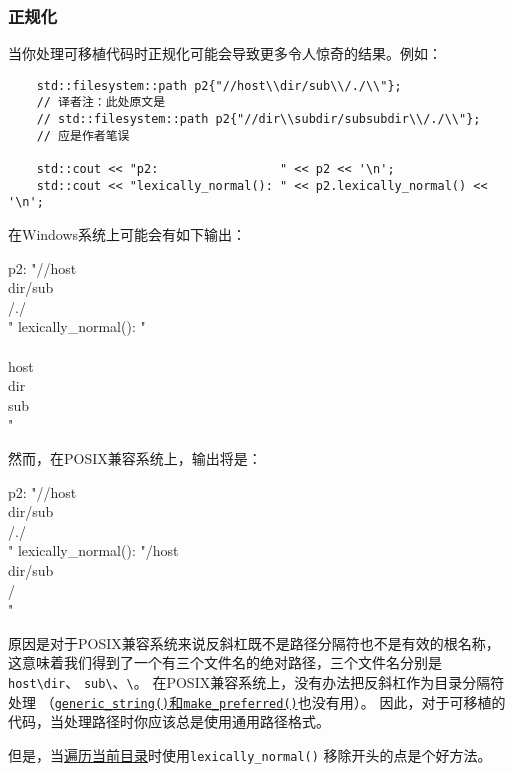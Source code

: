 \subsubsection{正规化}
当你处理可移植代码时正规化可能会导致更多令人惊奇的结果。例如：
\begin{lstlisting}
    std::filesystem::path p2{"//host\\dir/sub\\/./\\"};
    // 译者注：此处原文是
    // std::filesystem::path p2{"//dir\\subdir/subsubdir\\/./\\"};
    // 应是作者笔误

    std::cout << "p2:                 " << p2 << '\n';
    std::cout << "lexically_normal(): " << p2.lexically_normal() << '\n';
\end{lstlisting}
在Windows系统上可能会有如下输出：
\begin{blacklisting}
    p2:                 "//host\\dir/sub\\/./\\"
    lexically_normal(): "\\\\host\\dir\\sub\\"
\end{blacklisting}
然而，在POSIX兼容系统上，输出将是：
\begin{blacklisting}
    p2:                 "//host\\dir/sub\\/./\\"
    lexically_normal(): "/host\\dir/sub\\/\\"
\end{blacklisting}
原因是对于POSIX兼容系统来说反斜杠既不是路径分隔符也不是有效的根名称，
这意味着我们得到了一个有三个文件名的绝对路径，三个文件名分别是\texttt{host\textbackslash dir}、
\texttt{sub\textbackslash}、\texttt{\textbackslash}。
在POSIX兼容系统上，没有办法把反斜杠作为目录分隔符处理
（\hyperref[ch20.3.4]{\texttt{generic\_string()}和\texttt{make\_preferred()}}也没有用）。
因此，对于可移植的代码，当处理路径时你应该总是使用通用路径格式。

但是，当\hyperref[遍历.]{遍历当前目录}时使用\texttt{lexically\_normal()}
移除开头的点是个好方法。

